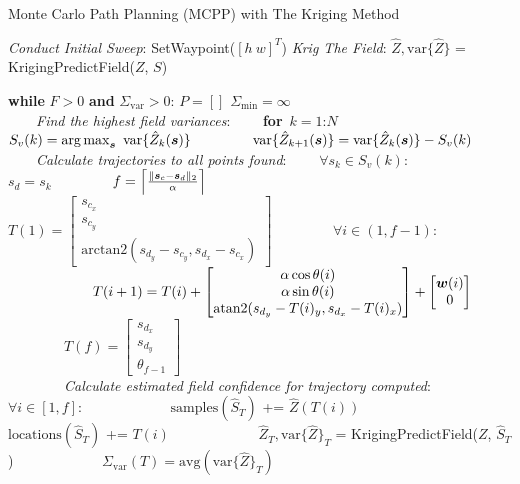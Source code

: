 \begin{algorithm}[h!]
\caption{Monte Carlo Path Planning (MCPP) with The Kriging Method}\label{alg:mcpp}
\begin{algorithmic}[1]
	\BState \emph{Conduct Initial Sweep}:
	\State SetWaypoint($[h\ w]^T$)
	\BState \emph{Krig The Field}:
	\State $\hat{Z}, \text{var}\{\hat{Z}\}$ = KrigingPredictField($Z$, $S$)

	\BState \textbf{while} $F > 0$ \textbf{and} $\Sigma_{\text{var}} > 0$:
	\State $P = []$
	\State $\Sigma_{\text{min}} = \infty$ \\

	\BState \ \ \ \ \emph{Find the highest field variances}:
	\State \ \ \ \ \textbf{for}\ $k = 1 \text{:} N$
	\State \ \ \ \  \ \ \ \ $S_{v}(k) = \argmax_{\vect{s}} \ \text{var}\{\hat{Z}_{k}(\vect{s})\}$
	\State \ \ \ \ \ \ \ \ $\text{var}\{\hat{Z}_{k+1}({\it{\boldsymbol{s}}})\} = \text{var}\{\hat{Z}_{k}({\it{\boldsymbol{s}}})\} - S_{v}(k)$\\

	\BState \ \ \ \  \emph{Calculate trajectories to all points found}:
	\State \ \ \ \  $\forall s_k \in S_{v}(k)$:
	\State \ \ \ \  \ \ \ \ $s_d = s_k$
	\State \ \ \ \  \ \ \ \ $f = \Big\lceil \frac{\|{\it{\boldsymbol{s}}}_c - {\it{\boldsymbol{s}}}_d\|_2}{\alpha} \Big\rceil$
	\State \ \ \ \  \ \ \ \ $T(1) = \begin{bmatrix} s_{c_x} \\ s_{c_y} \\ \text{arctan2}(s_{d_y} - s_{c_y}, s_{d_x} - s_{c_x}) \end{bmatrix}$
	\State \ \ \ \  \ \ \ \ $\forall i \in (1, f - 1)$:
	\State \ \ \ \  \ \ \ \  \ \ \ \ $T(i+1) = T(i) + \begin{bmatrix} \alpha \cos \theta(i) \\ \alpha \sin \theta(i) \\ \text{atan2}(s_{d_y} - T(i)_y, s_{d_x} - T(i)_x) \end{bmatrix} + \begin{bmatrix} {\it{\boldsymbol{w}}}(i) \\ 0 \end{bmatrix}$
	\State \ \ \ \  \ \ \ \ $T(f) = \begin{bmatrix} s_{d_x} \\ s_{d_y} \\ \theta_{f-1} \end{bmatrix}$\\

	\BState \ \ \ \  \ \ \ \  \emph{Calculate estimated field confidence for trajectory computed}:
	\State \ \ \ \  \ \ \ \  $\forall i \in [1, f]$:
	\State \ \ \ \  \ \ \ \  \ \ \ \ $\text{samples}(\hat{S}_T)$ += $\hat{Z}(T(i))$
	\State \ \ \ \  \ \ \ \  \ \ \ \ $\text{locations}(\hat{S}_T)$ += $T(i)$
	\State \ \ \ \  \ \ \ \  \ \ \ \ $\hat{Z}_T, \text{var}\{\hat{Z}\}_T$ = KrigingPredictField($Z$, $\hat{S}_T$)
	\State \ \ \ \  \ \ \ \  \ \ \ \ $\Sigma_{\text{var}}(T) = \text{avg}(\text{var}\{\hat{Z}\}_T)$\\


\end{algorithmic}
\end{algorithm}
